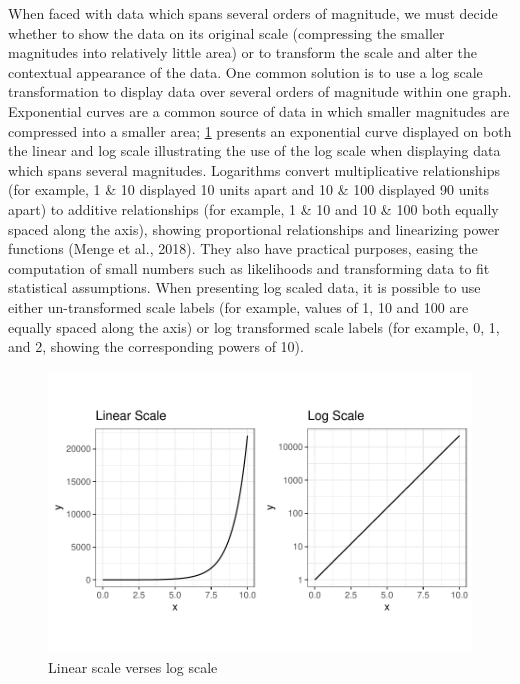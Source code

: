 \documentclass[print]{nuthesis}
\begin{document}
When faced with data which spans several orders of magnitude, we must decide whether to show the data on its original scale (compressing the smaller magnitudes into relatively little area) or to transform the scale and alter the contextual appearance of the data.
One common solution is to use a log scale transformation to display data over several orders of magnitude within one graph.
Exponential curves are a common source of data in which smaller magnitudes are compressed into a smaller area;
\cref{fig:log-scales} presents an exponential curve displayed on both the linear and log scale illustrating the use of the log scale when displaying data which spans several magnitudes.
Logarithms convert multiplicative relationships (for example, 1 \& 10 displayed 10 units apart and 10 \& 100 displayed 90 units apart) to additive relationships (for example, 1 \& 10 and 10 \& 100 both equally spaced along the axis), showing proportional relationships and linearizing power functions (Menge et al., 2018).
They also have practical purposes, easing the computation of small numbers such as likelihoods and transforming data to fit statistical assumptions.
When presenting log scaled data, it is possible to use either un-transformed scale labels (for example, values of 1, 10 and 100 are equally spaced along the axis) or log transformed scale labels (for example, 0, 1, and 2, showing the corresponding powers of 10).

\begin{figure}[tbp]

{\centering \includegraphics[width=1\linewidth,]{thesis_files/figure-latex/log-scales-1} 

}

\caption{Linear scale verses log scale}\label{fig:log-scales}
\end{figure}
\end{document}
